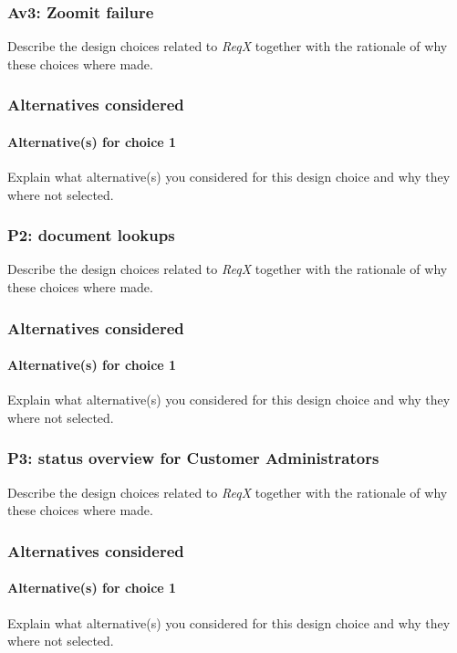\subsubsection{Av3: Zoomit failure}
Describe the design choices related to \emph{ReqX} together with the rationale
of why these choices where made.

\subsubsection*{Alternatives considered}
\paragraph{Alternative(s) for choice 1} Explain what alternative(s) you
considered for this design choice and why they where not selected.

\subsubsection{P2: document lookups}
Describe the design choices related to \emph{ReqX} together with the rationale
of why these choices where made.

\subsubsection*{Alternatives considered}
\paragraph{Alternative(s) for choice 1} Explain what alternative(s) you
considered for this design choice and why they where not selected.

\subsubsection{P3: status overview for Customer Administrators}
Describe the design choices related to \emph{ReqX} together with the rationale
of why these choices where made.

\subsubsection*{Alternatives considered}
\paragraph{Alternative(s) for choice 1} Explain what alternative(s) you
considered for this design choice and why they where not selected.

